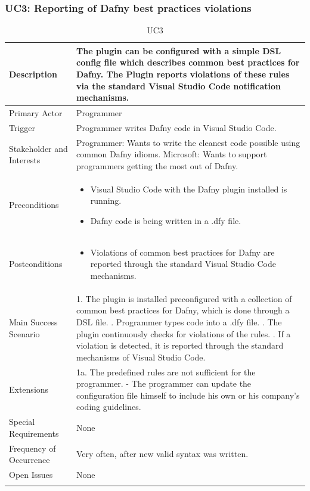 \subsubsection{UC3: Reporting of Dafny best practices violations}
\begin{longtable}{l | p{} }
	Description & The plugin can be configured with a simple DSL config file which describes common best practices for Dafny. The Plugin reports violations of these rules via the standard Visual Studio Code notification mechanisms.\\ \hline
	Primary Actor & Programmer\\ \hline
	Trigger & Programmer writes Dafny code in Visual Studio Code.\\ \hline
	Stakeholder and Interests & Programmer: Wants to write the cleanest code possible using common Dafny idioms. \newline Microsoft: Wants to support programmers getting the most out of Dafny.\\ \hline
	Preconditions &
	\begin{itemize}
		\item Visual Studio Code with the Dafny plugin installed is running.
		\item Dafny code is being written in a .dfy file.
	\end{itemize}\\ \hline
	Postconditions &
	\begin{itemize}
		\item Violations of common best practices for Dafny are reported through the standard Visual Studio Code mechanisms.
	\end{itemize}\\ \hline
	Main Success Scenario & 
	1. The plugin is installed preconfigured with a collection of common best practices for Dafny, which is done through a DSL file. \newline
	2. Programmer types code into a .dfy file. \newline 
	3. The plugin continuously checks for violations of the rules. \newline 
	4. If a violation is detected, it is reported through the standard mechanisms of Visual Studio Code.\\ \hline
	Extensions & 
	1a. The predefined rules are not sufficient for the programmer. \newline 
	- The programmer can update the configuration file himself to include his own or his company's coding guidelines. \\ \hline
	Special Requirements & None\\ \hline
	Frequency of Occurrence & Very often, after new valid syntax was written.\\ \hline
	Open Issues & None \\ \hline
	\caption{UC3}
\end{longtable}


